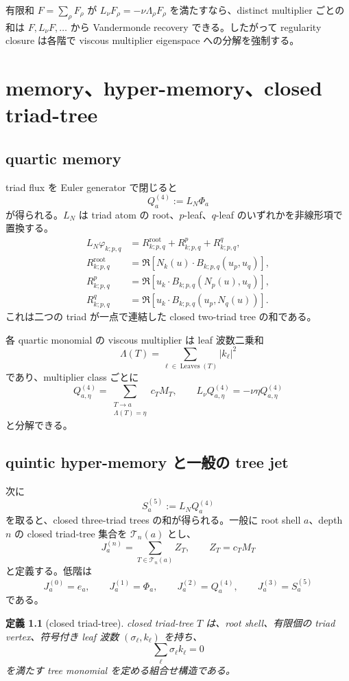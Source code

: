 \documentclass[11pt,a4paper,openany]{book}
\newtheorem{definition}{定義}[chapter]
\numberwithin{equation}{chapter}
\newcommand{\cT}{\mathcal T}
\begin{document}
有限和 $F=\sum_\rho F_\rho$ が $L_\nu F_\rho=-\nu\Lambda_\rho F_\rho$ を満たすなら、distinct multiplier ごとの和は $F,L_\nu F,\ldots$ から Vandermonde recovery できる。したがって regularity closure は各階で viscous multiplier eigenspace への分解を強制する。

\chapter{memory、hyper-memory、closed triad-tree}
\section{quartic memory}
triad flux を Euler generator で閉じると
\[
Q_a^{(4)}:=L_N\Phi_a
\]
が得られる。$L_N$ は triad atom の root、$p$-leaf、$q$-leaf のいずれかを非線形項で置換する。
\begin{align}
L_N\varphi_{k;p,q}
&=R^{\mathrm{root}}_{k;p,q}+R^p_{k;p,q}+R^q_{k;p,q},\\
R^{\mathrm{root}}_{k;p,q}
&=\Re\left[N_k(u)\cdot B_{k;p,q}(u_p,u_q)\right],\\
R^p_{k;p,q}
&=\Re\left[u_k\cdot B_{k;p,q}(N_p(u),u_q)\right],\\
R^q_{k;p,q}
&=\Re\left[u_k\cdot B_{k;p,q}(u_p,N_q(u))\right].
\end{align}
これは二つの triad が一点で連結した closed two-triad tree の和である。

各 quartic monomial の viscous multiplier は leaf 波数二乗和
\[
\Lambda(T)=\sum_{\ell\in\operatorname{Leaves}(T)}|k_\ell|^2
\]
であり、multiplier class ごとに
\[
Q_{a,\eta}^{(4)}
=\sum_{\substack{T\to a\\\Lambda(T)=\eta}}c_TM_T,
\qquad
L_\nu Q_{a,\eta}^{(4)}=-\nu\eta Q_{a,\eta}^{(4)}
\]
と分解できる。

\section{quintic hyper-memory と一般の tree jet}
次に
\[
S_a^{(5)}:=L_NQ_a^{(4)}
\]
を取ると、closed three-triad trees の和が得られる。一般に root shell $a$、depth $n$ の closed triad-tree 集合を $\cT_n(a)$ とし、
\[
J_a^{(n)}=\sum_{T\in\cT_n(a)}Z_T,
\qquad
Z_T=c_TM_T
\]
と定義する。低階は
\[
J_a^{(0)}=e_a,
\qquad
J_a^{(1)}=\Phi_a,
\qquad
J_a^{(2)}=Q_a^{(4)},
\qquad
J_a^{(3)}=S_a^{(5)}
\]
である。

\begin{definition}[closed triad-tree]
closed triad-tree $T$ は、root shell、有限個の triad vertex、符号付き leaf 波数 $(\sigma_\ell,k_\ell)$ を持ち、
\[
\sum_\ell\sigma_\ell k_\ell=0
\]
を満たす tree monomial を定める組合せ構造である。
\end{definition}
\end{document}
